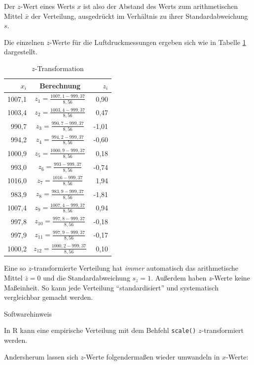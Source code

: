 \documentclass[
  11pt,
  ngerman,
  a4paper,
]{report}
\begin{document}
Der \(z\)-Wert eines Werts \(x\) ist also der Abstand des Werts zum arithmetischen Mittel \(\bar{x}\) der Verteilung, ausgedrückt im Verhältnis zu ihrer Standardabweichung \(s\).

Die einzelnen \(z\)-Werte für die Luftdruckmessungen ergeben sich wie in Tabelle \ref{tab:trans} dargestellt.

\begin{table}

\caption{\label{tab:trans}$z$-Transformation}
\centering
\begin{tabular}[t]{rcr}
\toprule
$x_i$ & Berechnung & $z_i$\\
\midrule
1007,1 & $z_{1}=\frac{1007,1-999,37}{8,56}$\medskip & 0,90\\
1003,4 & $z_{2}=\frac{1003,4-999,37}{8,56}$\medskip & 0,47\\
990,7 & $z_{3}=\frac{990,7-999,37}{8,56}$\medskip & -1,01\\
994,2 & $z_{4}=\frac{994,2-999,37}{8,56}$\medskip & -0,60\\
1000,9 & $z_{5}=\frac{1000,9-999,37}{8,56}$\medskip & 0,18\\
993,0 & $z_{6}=\frac{993-999,37}{8,56}$\medskip & -0,74\\
1016,0 & $z_{7}=\frac{1016-999,37}{8,56}$\medskip & 1,94\\
983,9 & $z_{8}=\frac{983,9-999,37}{8,56}$\medskip & -1,81\\
1007,4 & $z_{9}=\frac{1007,4-999,37}{8,56}$\medskip & 0,94\\
997,8 & $z_{10}=\frac{997,8-999,37}{8,56}$\medskip & -0,18\\
997,9 & $z_{11}=\frac{997,9-999,37}{8,56}$\medskip & -0,17\\
1000,2 & $z_{12}=\frac{1000,2-999,37}{8,56}$\medskip & 0,10\\
\bottomrule
\end{tabular}
\end{table}

Eine so \(z\)-transformierte Verteilung hat \emph{immer} automatisch das arithmetische Mittel \(\bar{z}=0\) und die Standardabweichung \(s_z=1\). Außerdem haben \(z\)-Werte keine Maßeinheit. So kann jede Verteilung \enquote{standardisiert} und systematisch vergleichbar gemacht werden.

Softwarehinweis

In R kann eine empirische Verteilung mit dem Behfehl \texttt{scale()} \(z\)-transformiert werden.

Andersherum lassen sich \(z\)-Werte folgendermaßen wieder umwandeln in \(x\)-Werte:
\end{document}
